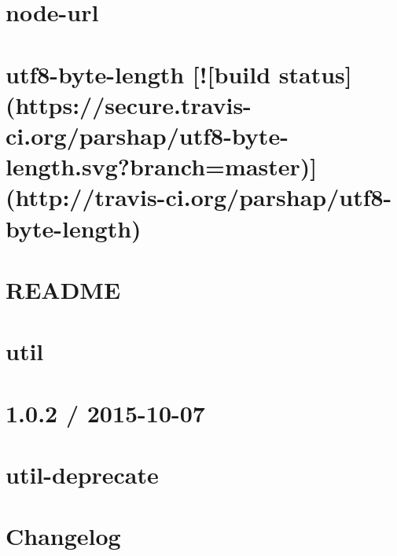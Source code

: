 \documentclass[twoside]{book}
\newcommand{\+}{\discretionary{\mbox{\scriptsize$\hookleftarrow$}}{}{}}
\begin{document}
\chapter{node-\/url}
\label{md_dsmacc_examples_DRmerge_node_modules_url_README}

\chapter{utf8-\/byte-\/length \mbox{[}!\mbox{[}build status\mbox{]}(https\+://secure.travis-\/ci.org/parshap/utf8-\/byte-\/length.svg?branch=master)\mbox{]}(http\+://travis-\/ci.org/parshap/utf8-\/byte-\/length)}
\label{md_dsmacc_examples_DRmerge_node_modules_utf8-byte-length_README}

\chapter{R\+E\+A\+D\+ME}
\label{md_dsmacc_examples_DRmerge_node_modules_util_node_modules_inherits_README}

\chapter{util}
\label{md_dsmacc_examples_DRmerge_node_modules_util_README}

\chapter{1.0.2 / 2015-\/10-\/07}
\label{md_dsmacc_examples_DRmerge_node_modules_util-deprecate_History}

\chapter{util-\/deprecate}
\label{md_dsmacc_examples_DRmerge_node_modules_util-deprecate_README}

\chapter{Changelog}
\label{md_dsmacc_examples_DRmerge_node_modules_uuid_CHANGELOG}

\end{document}
